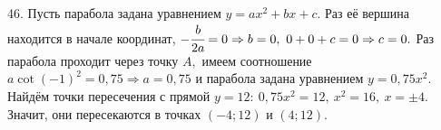 46. Пусть парабола задана уравнением $y=ax^2+bx+c.$ Раз её вершина находится в начале координат, $-\cfrac{b}{2a}=0\Rightarrow b=0,\ 0+0+c=0\Rightarrow c=0.$ Раз парабола проходит через точку $A,$ имеем соотношение $a\cot(-1)^2=0,75\Rightarrow a=0,75$ и парабола задана уравнением $y=0,75x^2.$ Найдём точки пересечения с прямой $y=12:\ 0,75x^2=12,\ x^2=16,\ x=\pm4.$ Значит, они пересекаются в точках $(-4;12)$ и $(4;12).$\\
